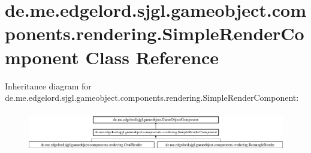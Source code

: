 \hypertarget{classde_1_1me_1_1edgelord_1_1sjgl_1_1gameobject_1_1components_1_1rendering_1_1_simple_render_component}{}\section{de.\+me.\+edgelord.\+sjgl.\+gameobject.\+components.\+rendering.\+Simple\+Render\+Component Class Reference}
\label{classde_1_1me_1_1edgelord_1_1sjgl_1_1gameobject_1_1components_1_1rendering_1_1_simple_render_component}
Inheritance diagram for de.\+me.\+edgelord.\+sjgl.\+gameobject.\+components.\+rendering.\+Simple\+Render\+Component\+:\begin{figure}[H]
\begin{center}
\leavevmode
\includegraphics[height=1.772152cm]{classde_1_1me_1_1edgelord_1_1sjgl_1_1gameobject_1_1components_1_1rendering_1_1_simple_render_component}
\end{center}
\end{figure}
